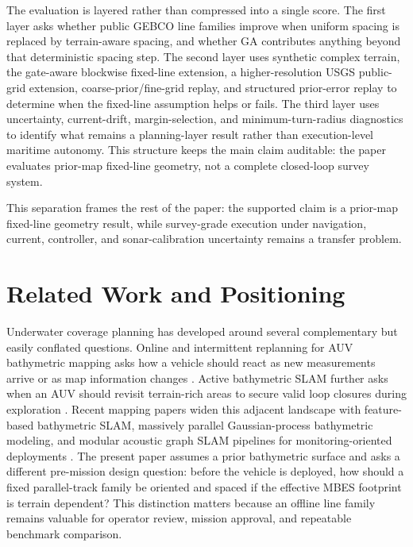 \documentclass[jmse,article,submit,moreauthors]{Definitions/mdpi}
\begin{document}
The evaluation is layered rather than compressed into a single score. The first layer asks whether public GEBCO line families improve when uniform spacing is replaced by terrain-aware spacing, and whether GA contributes anything beyond that deterministic spacing step. The second layer uses synthetic complex terrain, the gate-aware blockwise fixed-line extension, a higher-resolution USGS public-grid extension, coarse-prior/fine-grid replay, and structured prior-error replay to determine when the fixed-line assumption helps or fails. The third layer uses uncertainty, current-drift, margin-selection, and minimum-turn-radius diagnostics to identify what remains a planning-layer result rather than execution-level maritime autonomy. This structure keeps the main claim auditable: the paper evaluates prior-map fixed-line geometry, not a complete closed-loop survey system.

This separation frames the rest of the paper: the supported claim is a prior-map fixed-line geometry result, while survey-grade execution under navigation, current, controller, and sonar-calibration uncertainty remains a transfer problem.

\section{Related Work and Positioning}
\label{sec:related}
Underwater coverage planning has developed around several complementary but easily conflated questions. Online and intermittent replanning for AUV bathymetric mapping asks how a vehicle should react as new measurements arrive or as map information changes \cite{shi2020data,zhang2022online}. Active bathymetric SLAM further asks when an AUV should revisit terrain-rich areas to secure valid loop closures during exploration \cite{ling2023active}. Recent mapping papers widen this adjacent landscape with feature-based bathymetric SLAM, massively parallel Gaussian-process bathymetric modeling, and modular acoustic graph SLAM pipelines for monitoring-oriented deployments \cite{zhang2024tttslam,krasnosky2022gp,real2025acousticgraphslam,xu2025usoslam}. The present paper assumes a prior bathymetric surface and asks a different pre-mission design question: before the vehicle is deployed, how should a fixed parallel-track family be oriented and spaced if the effective MBES footprint is terrain dependent? This distinction matters because an offline line family remains valuable for operator review, mission approval, and repeatable benchmark comparison.
\end{document}

